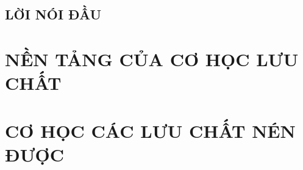 \documentclass{book}
\begin{document}
\dominitoc
\tableofcontents
\chapter*{LỜI NÓI ĐẦU}
	
\part{NỀN TẢNG CỦA CƠ HỌC LƯU CHẤT}
	
\part{CƠ HỌC CÁC LƯU CHẤT NÉN ĐƯỢC}
	
\end{document}
